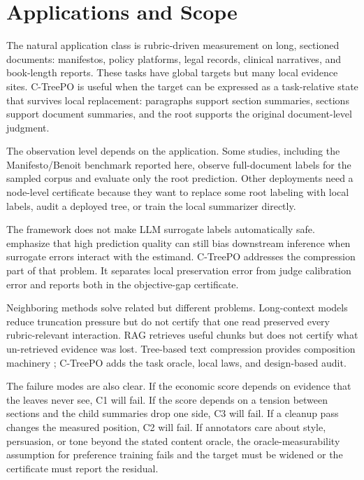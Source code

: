 \section{Applications and Scope}\label{sec:min-applications}

The natural application class is rubric-driven measurement on long, sectioned
documents: manifestos, policy platforms, legal records, clinical narratives,
and book-length reports. These tasks have global targets but many local
evidence sites. C-TreePO is useful when the target can be expressed as a
task-relative state that survives local replacement: paragraphs support
section summaries, sections support document summaries, and the root supports
the original document-level judgment.

The observation level depends on the application. Some studies, including the
Manifesto/Benoit benchmark reported here, observe full-document labels for the
sampled corpus and evaluate only the root prediction. Other deployments need a
node-level certificate because they want to replace some root labeling with
local labels, audit a deployed tree, or train the local summarizer directly.

The framework does not make LLM surrogate labels automatically safe.
\citet{EgamiEtAl2024} emphasize that high prediction quality can still bias
downstream inference when surrogate errors interact with the estimand. C-TreePO
addresses the compression part of that problem. It separates local
preservation error from judge calibration error and reports both in the
objective-gap certificate.

Neighboring methods solve related but different problems. Long-context models
reduce truncation pressure but do not certify that one read preserved every
rubric-relevant interaction. RAG retrieves useful chunks but does not certify
what un-retrieved evidence was lost. Tree-based text compression provides
composition machinery
\citep{KnightMarcu2000SentenceCompression,BarzilayMcKeown2005SentenceFusion,ClarkeLapata2008ILPSentenceCompression,KuznetsovaEtAl2014TreeTalk};
C-TreePO adds the task oracle, local laws, and design-based audit.

The failure modes are also clear. If the economic score depends on evidence
that the leaves never see, C1 will fail. If the score depends on a tension
between sections and the child summaries drop one side, C3 will fail. If a
cleanup pass changes the measured position, C2 will fail. If annotators care
about style, persuasion, or tone beyond the stated content oracle, the
oracle-measurability assumption for preference training fails and the target
must be widened or the certificate must report the residual.
